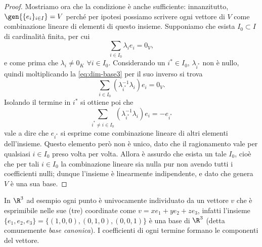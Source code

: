\begin{proof}
	Mostriamo ora che la condizione è anche sufficiente: innanzitutto, $\gen{\{  e_i\}_{i\in I}}=V$ perché per ipotesi possiamo scrivere ogni vettore di $V$ come combinazione lineare di elementi di questo insieme.
	Supponiamo che esista $I_0\subset I$ di cardinalità finita, per cui
	\begin{equation} \label{eq:dim-base3}
		\sum_{i\in I_0}\lambda_i  e_i=0_V,
	\end{equation}
e come prima che $\lambda_i\neq 0_K$ $\forall i\in I_0$.
	Considerando un $i^*\in I_0$, $\lambda_{i^*}$ non è nullo, quindi moltiplicando la \eqref{eq:dim-base3} per il suo inverso si trova
	\begin{equation*}
		\sum_{i\in I_0}(\lambda_{i^*}^{-1}\lambda_i)  e_i=0_V.
	\end{equation*}
	Isolando il termine in $i^*$ si ottiene poi che
	\begin{equation*}
		\sum_{i^*\neq i\in I_0} (\lambda_{i^*}^{-1}\lambda_i)  e_i=-  e_{i^*}
	\end{equation*}
	vale a dire che $  e_{i^*}$ si esprime come combinazione lineare di altri elementi dell'insieme.
	Questo elemento però non è unico, dato che il ragionamento vale per qualsiasi $i\in I_0$ preso volta per volta.
	Allora è assurdo che esista un tale $I_0$, cioè che per tali $i\in I_0$ la combinazione lineare sia nulla pur non avendo tutti i coefficienti nulli; dunque l'insieme è linearmente indipendente, e dato che genera $V$ è una sua base.
\end{proof}
In $\R^3$ ad esempio ogni punto è univocamente individuato da un vettore $  v$ che è esprimibile nelle sue (tre) coordinate come $  v=xe_1+ye_2+ze_3$, infatti l'insieme $\{e_1,e_2,e_3\}=\{(1,0,0),(0,1,0),(0,0,1)\}$ è una base di $\R^3$ (detta comunemente \emph{base canonica}).
I coefficienti di ogni termine formano le componenti del vettore.

